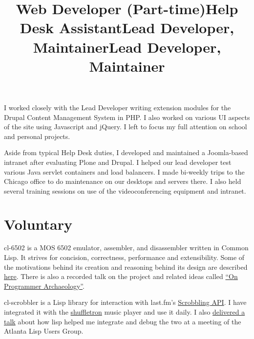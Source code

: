 \documentclass[margintitle,line]{res}
\renewcommand{\subsection}[1]{\section{\normalfont #1}}
\begin{document}
\begin{resume}
\title{Web Developer (Part-time)}
\begin{position}
  I worked closely with the Lead Developer writing extension modules
  for the Drupal Content Management System in PHP. I also worked on
  various UI aspects of the site using Javascript and jQuery.
  I left to focus my full attention on school and personal projects.
\end{position}

\title{Help Desk Assistant}
\begin{position}
  Aside from typical Help Desk duties, I developed and maintained
  a Joomla-based intranet after evaluating Plone and Drupal. I
  helped our lead developer test various Java servlet containers and
  load balancers. I made bi-weekly trips to the Chicago office to do
  maintenance on our desktops and servers there. I also held several
  training sessions on use of the videoconferencing equipment and intranet.
\end{position}


\subsection{Voluntary}


\title{Lead Developer, Maintainer}
\begin{position}
  cl-6502 is a MOS 6502 emulator, assembler, and disassembler written in Common Lisp.
  It strives for concision, correctness, performance and extensibility. Some of the
  motivations behind its creation and reasoning behind its design are described
  \href{http://redlinernotes.com/blog/?p=1421}{here}. There is also a recorded talk on
  the project and related ideas called
  \href{http://vimeo.com/redline6561/on-programmer-archaeology}{``On Programmer Archaeology''}.
\end{position}

\title{Lead Developer, Maintainer}
\begin{position}
  cl-scrobbler is a Lisp library for interaction with last.fm's
  \href{http://www.last.fm/api/scrobbling}{Scrobbling API}. I have integrated
  it with the \href{http://vintage-digital.com/hefner/software/shuffletron/}{shuffletron}
  music player and use it daily. I also
  \href{http://redlinernotes.com/docs/talks/cl-mft.html}{delivered a talk}
  about how lisp helped me integrate and debug the two at a meeting of the
  Atlanta Lisp Users Group.
\end{position}


\end{resume}
\end{document}
